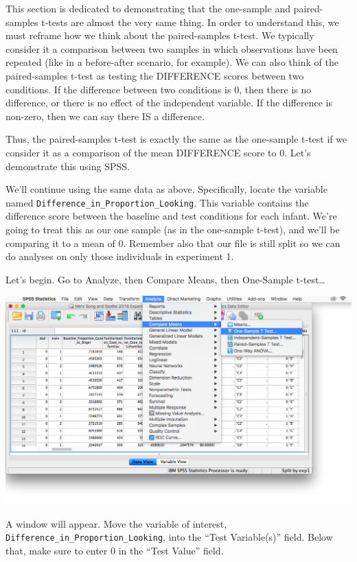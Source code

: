 \documentclass[
]{book}
\begin{document}
This section is dedicated to demonstrating that the one-sample and paired-samples t-tests are almost the very same thing. In order to understand this, we must reframe how we think about the paired-samples t-test. We typically consider it a comparison between two samples in which observations have been repeated (like in a before-after scenario, for example). We can also think of the paired-samples t-test as testing the DIFFERENCE scores between two conditions. If the difference between two conditions is 0, then there is no difference, or there is no effect of the independent variable. If the difference is non-zero, then we can say there IS a difference.

Thus, the paired-samples t-test is exactly the same as the one-sample t-test if we consider it as a comparison of the mean DIFFERENCE score to 0. Let's demonstrate this using SPSS.

We'll continue using the same data as above. Specifically, locate the variable named \texttt{Difference\_in\_Proportion\_Looking}. This variable contains the difference score between the baseline and test conditions for each infant. We're going to treat this as our one sample (as in the one-sample t-test), and we'll be comparing it to a mean of 0. Remember also that our file is still split so we can do analyses on only those individuals in experiment 1.

Let's begin. Go to {Analyze}, then {Compare Means}, then {One-Sample t-test\ldots{}}

\includegraphics{img/6.4.31.png}

A window will appear. Move the variable of interest, \texttt{Difference\_in\_Proportion\_Looking}, into the ``Test Variable(s)'' field. Below that, make sure to enter 0 in the ``Test Value'' field.
\end{document}
